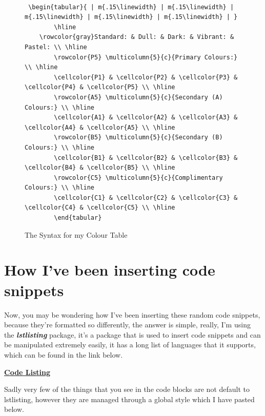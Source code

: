 \documentclass[12pt, letterpaper, oneside]{article} \usepackage[utf8]{inputenc}
\begin{document}
\clearpage
\thispagestyle{empty}
\begin{landscape}

	\begin{center}
\begin{figure}[H]
	\begin{lstlisting}

 \begin{tabular}{ | m{.15\linewidth} | m{.15\linewidth} | m{.15\linewidth} | m{.15\linewidth} | m{.15\linewidth} | } 
        \hline
	\rowcolor{gray}Standard: & Dull: & Dark: & Vibrant: & Pastel: \\ \hline
        \rowcolor{P5} \multicolumn{5}{c}{Primary Colours:} \\ \hline
        \cellcolor{P1} & \cellcolor{P2} & \cellcolor{P3} & \cellcolor{P4} & \cellcolor{P5} \\ \hline
        \rowcolor{A5} \multicolumn{5}{c}{Secondary (A) Colours:} \\ \hline
        \cellcolor{A1} & \cellcolor{A2} & \cellcolor{A3} & \cellcolor{A4} & \cellcolor{A5} \\ \hline
        \rowcolor{B5} \multicolumn{5}{c}{Secondary (B) Colours:} \\ \hline
        \cellcolor{B1} & \cellcolor{B2} & \cellcolor{B3} & \cellcolor{B4} & \cellcolor{B5} \\ \hline
        \rowcolor{C5} \multicolumn{5}{c}{Complimentary Colours:} \\ \hline
        \cellcolor{C1} & \cellcolor{C2} & \cellcolor{C3} & \cellcolor{C4} & \cellcolor{C5} \\ \hline
        \end{tabular}

	\end{lstlisting}
	\centering
	\caption{The Syntax for my Colour Table}
\end{figure}
	\end{center}

\end{landscape}

\section{How I've been inserting code snippets}

Now, you may be wondering how I've been inserting these random code snippets, because they're formatted so differently, the answer is simple, really, I'm using the \textbf{\emph{lstlisting}} package, it's a package that is used to insert code snippets and can be manipulated extremely easily, it has a long list of languages that it supports, which can be found in the link below. 
\\
\begin{center}
\textbf{\href{https://www.sharelatex.com/learn/Code\_listing}{Code Listing}}
\end{center}
Sadly very few of the things that you see in the code blocks are not default to lstlisting, however they are managed through a global style which I have pasted below.
\end{document}
